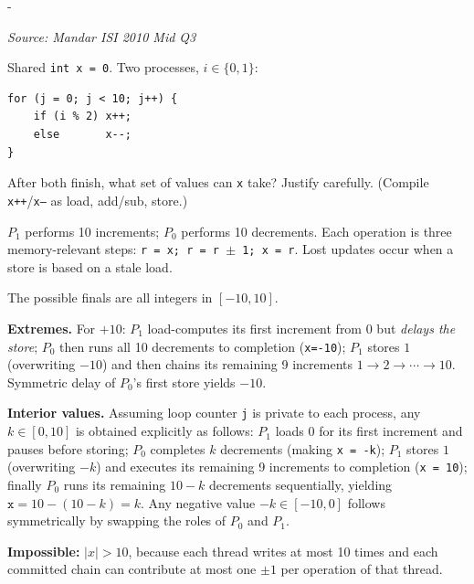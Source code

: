\documentclass[11pt,a4paper]{article}
\makeatletter
\newcommand{\keepspace}[1]{\par\penalty-100\begingroup
  \setlength{\dimen@}{#1}\dimen@ii\pagegoal\advance\dimen@ii-\pagetotal
  \ifdim\dimen@>\dimen@ii\ifdim\dimen@ii>\z@\vfil\fi\break\fi\endgroup}
\newcounter{qn}[section]
\newenvironment{Qn}[4]{%
  \refstepcounter{qn}\keepspace{7\baselineskip}%
  \begin{tcolorbox}[qboxstyle, title={Q\thesection.\theqn\ \ [#1 \textbar\ #2]\ \ #4}]%
  {\footnotesize\color{g3}\textit{Source: #3}}\par\smallskip%
}{%
  \end{tcolorbox}%
}
\newenvironment{Sol}{%
  \begin{tcolorbox}[sboxstyle, title={Solution}]%
}{%
  \end{tcolorbox}\vspace{0.35em}%
}
\makeatother
\begin{document}
\begin{Qn}{Hard}{Lect 16}{Mandar ISI 2010 Mid Q3}{Possible finals of racy \texttt{x++} / \texttt{x--}}
Shared \texttt{int x = 0}. Two processes, $i\in\{0,1\}$:

\begin{lstlisting}[numbers=none]
for (j = 0; j < 10; j++) {
    if (i % 2) x++;
    else       x--;
}
\end{lstlisting}

After both finish, what set of values can \texttt{x} take? Justify carefully. (Compile \texttt{x++}/\texttt{x--} as load, add/sub, store.)
\end{Qn}
\begin{Sol}
$P_1$ performs 10 increments; $P_0$ performs 10 decrements. Each operation is three memory-relevant steps: \texttt{r = x; r = r $\pm$ 1; x = r}. Lost updates occur when a store is based on a stale load.

The possible finals are all integers in $[-10,10]$.

\textbf{Extremes.} For $+10$: $P_1$ load-computes its first increment from 0 but \emph{delays the store}; $P_0$ then runs all 10 decrements to completion (\texttt{x=-10}); $P_1$ stores $1$ (overwriting $-10$) and then chains its remaining 9 increments $1\to 2\to\cdots\to 10$. Symmetric delay of $P_0$'s first store yields $-10$.

\textbf{Interior values.} Assuming loop counter \texttt{j} is private to each process, any $k\in[0,10]$ is obtained explicitly as follows: $P_1$ loads $0$ for its first increment and pauses before storing; $P_0$ completes $k$ decrements (making \texttt{x = -k}); $P_1$ stores $1$ (overwriting $-k$) and executes its remaining 9 increments to completion (\texttt{x = 10}); finally $P_0$ runs its remaining $10-k$ decrements sequentially, yielding $\texttt{x} = 10 - (10-k) = k$. Any negative value $-k\in[-10,0]$ follows symmetrically by swapping the roles of $P_0$ and $P_1$.

\textbf{Impossible:} $|x|>10$, because each thread writes at most 10 times and each committed chain can contribute at most one $\pm 1$ per operation of that thread.
\end{Sol}
\end{document}
